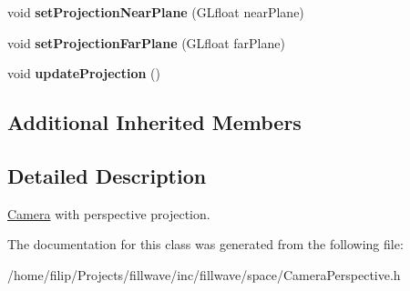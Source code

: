 \begin{DoxyCompactItemize}
\item 
\hypertarget{classfillwave_1_1space_1_1CameraPerspective_adf96078566258ddf46643d1f1f0f13ef}{}void {\bfseries set\+Projection\+Near\+Plane} (G\+Lfloat near\+Plane)\label{classfillwave_1_1space_1_1CameraPerspective_adf96078566258ddf46643d1f1f0f13ef}

\item 
\hypertarget{classfillwave_1_1space_1_1CameraPerspective_a1feb81361eeb1c607f8a2b34169e73a4}{}void {\bfseries set\+Projection\+Far\+Plane} (G\+Lfloat far\+Plane)\label{classfillwave_1_1space_1_1CameraPerspective_a1feb81361eeb1c607f8a2b34169e73a4}

\item 
\hypertarget{classfillwave_1_1space_1_1CameraPerspective_ad9e09f2d1a77c00e69cb2369249ce357}{}void {\bfseries update\+Projection} ()\label{classfillwave_1_1space_1_1CameraPerspective_ad9e09f2d1a77c00e69cb2369249ce357}

\end{DoxyCompactItemize}
\subsection*{Additional Inherited Members}


\subsection{Detailed Description}
\hyperlink{classfillwave_1_1space_1_1Camera}{Camera} with perspective projection. 

The documentation for this class was generated from the following file\+:\begin{DoxyCompactItemize}
\item 
/home/filip/\+Projects/fillwave/inc/fillwave/space/Camera\+Perspective.\+h\end{DoxyCompactItemize}
